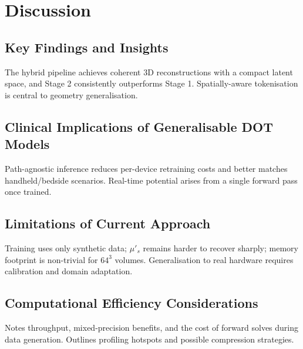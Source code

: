 
\chapter{Discussion}

\section{Key Findings and Insights}

The hybrid pipeline achieves coherent 3D reconstructions with a compact latent space, and Stage 2 consistently outperforms Stage 1. Spatially-aware tokenisation is central to geometry generalisation.


\section{Clinical Implications of Generalisable DOT Models}

Path-agnostic inference reduces per-device retraining costs and better matches handheld/bedside scenarios. Real-time potential arises from a single forward pass once trained.


\section{Limitations of Current Approach}

Training uses only synthetic data; $\mu'_s$ remains harder to recover sharply; memory footprint is non-trivial for $64^3$ volumes. Generalisation to real hardware requires calibration and domain adaptation.


\section{Computational Efficiency Considerations}

Notes throughput, mixed-precision benefits, and the cost of forward solves during data generation. Outlines profiling hotspots and possible compression strategies.


